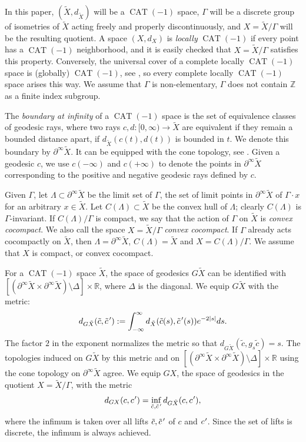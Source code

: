 \documentclass[10pt]{amsart}
\newcommand{\cpr}{c\mkern1mu'}
\newcommand{\tcpr}{\tilde c\mkern2mu'}
\theoremstyle{definition}
\numberwithin{equation}{section}
\DeclareMathOperator{\CAT}{CAT}
\begin{document}
In this paper, $(\tilde X, d_{\tilde X})$ will be a $\CAT(-1)$ space, $\Gamma$ will be a discrete group of isometries of $\tilde X$ acting freely and properly discontinuously, and $X=\tilde X/\Gamma$ will be the resulting quotient. A space $(X,d_X)$ is \emph{locally} $\CAT(-1)$ if every point has a $\CAT(-1)$ neighborhood, and it is easily checked that $X=\tilde X/\Gamma$ satisfies this property. Conversely, the universal cover of a complete locally $\CAT(-1)$ space is (globally) $\CAT(-1)$, see \eg \cite[Th.\,II.4.1]{bh}, so every complete locally $\CAT(-1)$ space arises this way. We assume that $\Gamma$ is non-elementary, \ie $\Gamma$ does not contain $\mathbb{Z}$ as a finite index subgroup.

The \emph{boundary at infinity} of a $\CAT(-1)$ space is the set of equivalence classes of geodesic rays, where two rays $c,d:[0,\infty) \to \tilde X$ are equivalent if they remain a bounded distance apart, \ie if $d_{\tilde X}(c(t), d(t))$ is bounded in $t$. We denote this boundary by $\partial^\infty \tilde X$. It can be equipped with the cone topology, see \eg \cite[Chap.\,II.8]{bh}. Given a geodesic $c$, we use $c(-\infty)$ and $c(+\infty)$ to denote the points in $\partial^\infty \tilde X$ corresponding to the positive and negative geodesic rays defined by $c$.

Given $\Gamma$, let $\Lambda \subset \partial^\infty \tilde X$ be the limit set of $\Gamma$, \ie the set of limit points in $\partial^\infty\tilde X$ of $\Gamma\cdot x$ for an arbitrary $x\in \tilde X$. Let $C(\Lambda) \subset \tilde X$ be the convex hull of $\Lambda$; clearly $C(\Lambda)$ is $\Gamma$\nobreakdash-invariant. If $C(\Lambda)/\Gamma$ is compact, we say that the action of $\Gamma$ on $\tilde X$ is \emph{convex cocompact}. We also call the space $X=\tilde X/\Gamma$ \emph{convex cocompact}. If $\Gamma$ already acts cocompactly on $\tilde X$, then $\Lambda=\partial^\infty \tilde X$, $C(\Lambda) = \tilde X$ and $X= C(\Lambda)/\Gamma$. We assume that $X$ is compact, or convex cocompact.

For a $\CAT(-1)$ space $\tilde X$, the space of geodesics $G\tilde X$ can be identified with \hbox{$[(\partial^\infty\tilde X \times \partial^\infty\tilde X)\setminus \Delta] \times \mathbb{R}$}, where $\Delta$ is the diagonal. We equip $G\tilde X$ with the metric:
\[ d_{G\tilde X}(\tilde c,\tcpr) := \int_{-\infty}^\infty d_{\tilde X}(\tilde c(s),\tcpr(s)) e^{-2|s|}ds.\]
The factor $2$ in the exponent normalizes the metric so that $d_{G\tilde X}(\tilde c, g_s \tilde c)=s$. The topologies induced on $G\tilde X$ by this metric and on $[(\partial^\infty\tilde X \times \partial^\infty\tilde X)\setminus \Delta] \times \mathbb{R}$ using the cone topology on $\partial^\infty \tilde X$ agree.
We equip $GX$, the space of geodesics in the quotient $X=\tilde X/\Gamma$, with the metric
\[ d_{GX}(c,\cpr) = \inf_{\tilde c,\tcpr} d_{G\tilde X}(c,\cpr),\]
where the infimum is taken over all lifts $\tilde c, \tcpr$ of $c$ and $\cpr$. Since the set of lifts is discrete, the infimum is always achieved.
\end{document}
